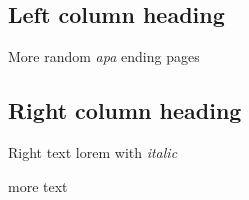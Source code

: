 \begin{pages}
\begin{Leftside}
\beginnumbering
\pstart
\section{Left column heading}\hypertarget{left-column-heading}{}\label{left-column-heading}

More random \emph{apa}
ending pages

\pend
\endnumbering
\end{Leftside}
\begin{Rightside}
\ledsectnotoc
\beginnumbering
\pstart
\section*{Right column heading}

Right text lorem with \emph{italic}

\pend
\endnumbering
\end{Rightside}
\end{pages}
\Pages
more text

